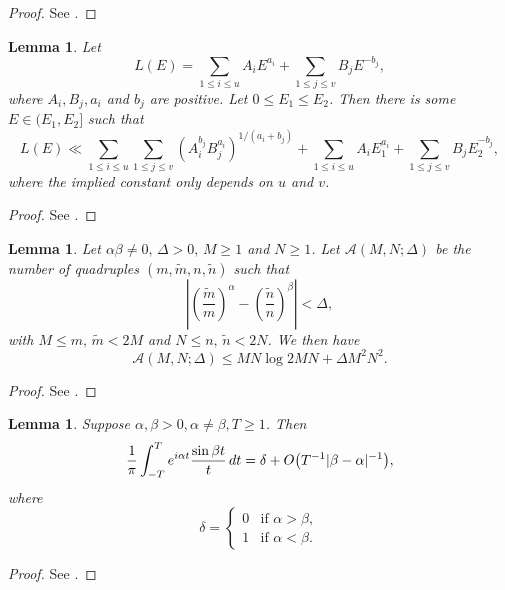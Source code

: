 \documentclass[12pt, reqno, twoside, letterpaper]{amsart}
\numberwithin{equation}{section}
\theoremstyle{customthm}
\newtheorem{lemma}[X]{Lemma}
\theoremstyle{customrem}
\def\int{\intop\nolimits}
\begin{document}
	\begin{proof}
		See \cite[Theorem~2.8]{GraKol}.
	\end{proof}
	
	\begin{lemma} \label{lemmea: balance} Let
		$$
		L(E)=\sum_{1\leqslant i\leqslant u}A_iE^{a_i}+\sum_{1\leqslant j\leqslant v}B_jE^{-b_j},
		$$
		where $A_i,B_j,a_i$ and $b_j$ are positive. Let $0\leqslant E_1\leqslant E_2$. Then there is
		some $E\in(E_1,E_2]$ such that
		$$
		L(E)\ll \sum_{1\leqslant i\leqslant u}\sum_{1\leqslant j\leqslant v}\left(A_i^{b_j}B_j^{a_i}\right)^{1/(a_i+b_j)}
		+\sum_{1\leqslant i\leqslant u}A_iE_1^{a_i}+\sum_{1\leqslant j\leqslant v}B_jE_2^{-b_j},
		$$
		where the implied constant only depends on $u$ and $v$.
	\end{lemma}
	
	\begin{proof}
		See \cite[Lemma~2.4]{GraKol}.
	\end{proof}
	
	\begin{lemma}\label{lemma:FoIw}
		Let $ \alpha \beta \neq 0, \, \Delta > 0, \, M \geqslant 1 $ and $ N \geqslant 1 $. 
		Let $ \mathcal{A}(M, N; \Delta) $ be the number of quadruples $(m, \tilde{m}, n, \tilde{n})$ such that
		$$
		\left| \left( \frac{\tilde{m}}{m} \right)^\alpha - \left( \frac{\tilde{n}}{n} \right)^\beta \right| < \Delta,
	    $$
		with $ M \leqslant m, \, \tilde{m} < 2M $ and $ N \leqslant n, \, \tilde{n} < 2N $. 
		We then have
		$$
		\mathcal{A}(M, N; \Delta) \leqslant MN \log 2MN + \Delta M^2 N^2.
		$$
	\end{lemma}
	
	\begin{proof}
		See \cite[Lemma~1]{FoIw}.
	\end{proof}
	
	\begin{lemma}\label{lemma:perron}
		Suppose $\alpha, \beta > 0, \alpha \neq \beta, T \geqslant 1$. Then		
		$$
		\frac{1}{\pi} \int_{-T}^{T} e^{i\alpha t} \frac{\sin \beta t}{t} \, dt = \delta + O\bigl(T^{-1}|\beta - \alpha|^{-1}\bigr),
		$$		
		where
		$$
		\delta =
		\begin{cases} 
			0 & \text{if } \alpha > \beta, \\
			1 & \text{if } \alpha < \beta.
		\end{cases}
		$$
	\end{lemma}
	
	\begin{proof}
		See \cite[Lemma~2.2]{Ha}.
	\end{proof}
	
\end{document}
